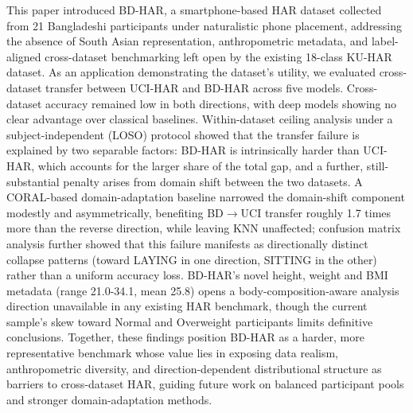 \documentclass[conference]{IEEEtran}
\begin{document}
This paper introduced BD-HAR, a smartphone-based HAR dataset collected
from 21 Bangladeshi participants under naturalistic phone placement,
addressing the absence of South Asian representation, anthropometric
metadata, and label-aligned cross-dataset benchmarking left open by
the existing 18-class KU-HAR dataset. As an application demonstrating
the dataset's utility, we evaluated cross-dataset transfer between
UCI-HAR and BD-HAR across five models. Cross-dataset accuracy remained
low in both directions, with deep models showing no clear advantage
over classical baselines. Within-dataset ceiling analysis under a
subject-independent (LOSO) protocol showed that the transfer failure
is explained by two separable factors: BD-HAR is intrinsically harder
than UCI-HAR, which accounts for the larger share of the total gap,
and a further, still-substantial penalty arises from domain shift
between the two datasets. A CORAL-based domain-adaptation baseline
narrowed the domain-shift component modestly and asymmetrically,
benefiting BD$\rightarrow$UCI transfer roughly 1.7 times more than the
reverse direction, while leaving KNN unaffected; confusion matrix
analysis further showed that this failure manifests as directionally
distinct collapse patterns (toward LAYING in one direction, SITTING in
the other) rather than a uniform accuracy loss. BD-HAR's novel
height, weight and BMI metadata (range 21.0-34.1, mean 25.8) opens a
body-composition-aware analysis direction unavailable in any existing
HAR benchmark, though the current sample's skew toward Normal and
Overweight participants limits definitive conclusions. Together, these
findings position BD-HAR as a harder, more representative benchmark
whose value lies in exposing data realism, anthropometric diversity,
and direction-dependent distributional structure as barriers to
cross-dataset HAR, guiding future work on balanced participant pools
and stronger domain-adaptation methods.



\end{document}
